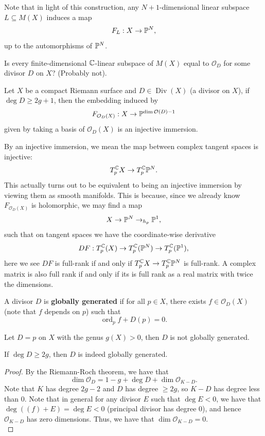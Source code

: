 \documentclass{article}
\begin{document}
{\begin{remark}
Note that in light of this construction, any $N+1$-dimensional linear subspace $L \subseteq M(X)$ induces a map
\[F_L: X \to \mathbb{P}^N,\]
up to the automorphisms of $\mathbb{P}^N$.    
\end{remark}

\begin{question}
    Is every finite-dimensional $\mathbb{C}$-linear subspace of $M(X)$ equal to $\mathcal{O}_D$ for some divisor $D$ on $X$? (Probably not).
\end{question}

\begin{theorem}
    Let $X$ be a compact Riemann surface and $D \in \operatorname{Div}(X)$ (a divisor on $X$), if $\deg D \geq 2g + 1$, then the embedding induced by
    \[F_{\mathcal{O}_D(X)}:  X \to \mathbb{P}^{\dim \mathcal{O}(D) - 1}\]
    given by taking a basis of $\mathcal{O}_D(X)$ is an injective immersion.
\end{theorem}
By an injective immersion, we mean the map between complex tangent spaces is injective:
    \[T^{\mathbb{C}}_p X \to T^{\mathbb{C}}_p \mathbb{P}^N.\]
    This actually turns out to be equivalent to being an injective immersion by viewing them as smooth manifolds. This is because, since we already know $F_{\mathcal{O}_D(X)}$ is holomorphic, we may find a map
    \[X \to \mathbb{P}^N \to_{h_p} \mathbb{P}^1,\]
    such that on tangent spaces we have the coordinate-wise derivative 
    \[DF: T_p^{\mathbb{C}}(X) \to T^{\mathbb{C}}_p(\mathbb{P}^N) \to T^{\mathbb{C}}_p(\mathbb{P}^1),\]
    here we see $DF$ is full-rank if and only if $T^{\mathbb{C}}_p X \to T^{\mathbb{C}}_p \mathbb{P}^N$ is full-rank. A complex matrix is also full rank if and only if its is full rank as a real matrix with twice the dimensions.

\begin{definition}
    A divisor $D$ is \textbf{globally generated} if for all $p \in X$, there exists $f \in \mathcal{O}_D(X)$ (note that $f$ depends on $p$) such that
    \[\operatorname{ord}_p f + D(p) = 0.\]
\end{definition}

\begin{example}
    Let $D = p$ on $X$ with the genus $g(X) > 0$, then $D$ is not globally generated.
\end{example}

\begin{lemma}
    If $\deg D \geq 2g$, then $D$ is indeed globally generated.
\end{lemma}

\begin{proof}
    By the Riemann-Roch theorem, we have that
    \[\dim \mathcal{O}_D = 1 - g + \deg D + \dim \mathcal{O}_{K-D}.\]
    Note that $K$ has degree $2g - 2$ and $D$ has degree $\geq 2g$, so $K-D$ has degree less than $0$. Note that in general for any divisor $E$ such that $\deg E < 0$, we have that $\deg ((f) + E) = \deg E < 0$ (principal divisor has degree $0$), and hence $\mathcal{O}_{K-D}$ has zero dimensions. Thus, we have that $\dim \mathcal{O}_{K-D} = 0$.\\


\end{proof}}
\end{document}
